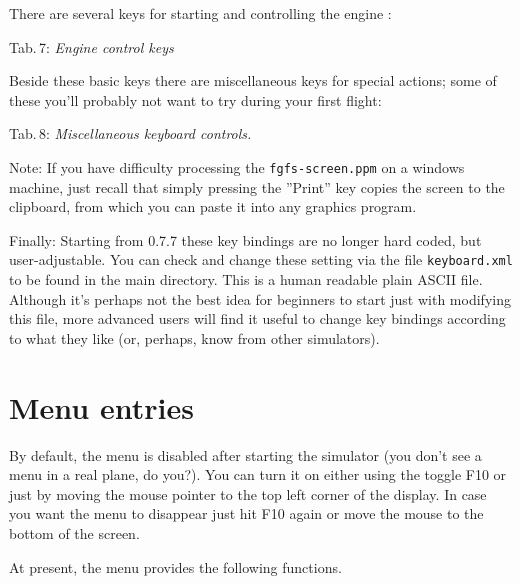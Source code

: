 There are several keys for starting and controlling the engine :

\noindent
 Tab.\,7: \textit{Engine control keys}
\medskip

\centerline{}
\medskip

Beside these basic keys there are miscellaneous keys for special actions; some of these you'll probably not want to try during your first flight:
\vfill
\eject

\noindent Tab.\,8: \textit{Miscellaneous keyboard controls.}
\medskip

\centerline{}
\medskip

\noindent
 Note: If you have difficulty processing the  \texttt{fgfs-screen.ppm}
on a windows machine, just recall that simply pressing the ''Print'' key copies the
screen to the clipboard, from which you can paste it into any graphics program.

Finally: Starting from \FlightGear{} 0.7.7  these key bindings are no longer hard coded, but user-adjustable. You can check and change these setting via the file \texttt{keyboard.xml} to
be found in the main \FlightGear{} directory. This is a human readable plain ASCII file.
Although it's perhaps not the best idea for beginners to start just with modifying this
file, more advanced users will find it useful to change key bindings according to what
they like (or, perhaps, know from other simulators).

\section{Menu entries}

By default, the menu is disabled after starting the simulator (you don't see a menu in a real plane, do you?). You can turn it on either using the toggle F10 or just by moving the mouse pointer to the top left corner of the display. In case you want the menu to disappear just hit F10 again or move the mouse to the bottom of the screen.

At present, the menu provides the following functions.

